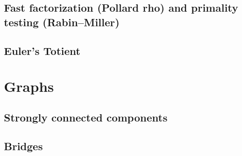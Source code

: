 \documentclass[12pt]{extarticle}
\begin{document}
\begin{multicols*}{2}
% 

\subsection{Fast factorization (Pollard rho) and primality testing
(Rabin--Miller)} %


\subsection{Euler's Totient} %


\section{Graphs}

\subsection{Strongly connected components} %


\subsection{Bridges} %


% 


\end{multicols*}
\end{document}
